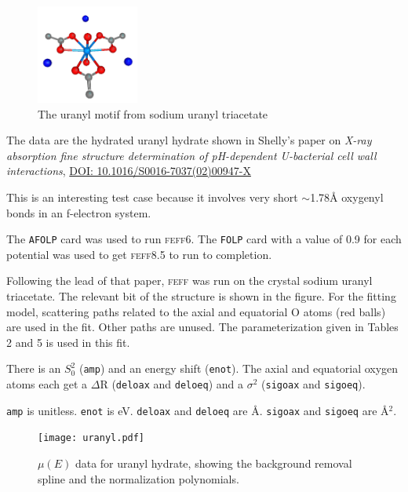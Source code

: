 \documentclass[11pt]{article}
\begin{document}
\begin{figure}
  \begin{center}
    \includegraphics[width=0.3\textwidth]{uranyl/uranyl.png}
  \end{center}
  \caption{The uranyl motif from sodium uranyl triacetate}
\end{figure}

The data are the hydrated uranyl hydrate shown in Shelly's paper on
\emph{X-ray absorption fine structure determination of pH-dependent
  U-bacterial cell wall interactions},
\href{http://dx.doi.org/10.1016/S0016-7037(02)00947-X}{DOI:
  10.1016/S0016-7037(02)00947-X}

This is an interesting test case because it involves very short
$\sim$1.78{\AA} oxygenyl bonds in an f-electron system.

The \texttt{AFOLP} card was used to run \textsc{feff6}. The
\texttt{FOLP} card with a value of 0.9 for each potential was used to
get \textsc{feff8.5} to run to completion.

Following the lead of that paper, \textsc{feff} was run on the crystal sodium
uranyl triacetate. The relevant bit of the structure is shown in the
figure. For the fitting model, scattering paths related to the axial
and equatorial O atoms (red balls) are used in the fit. Other paths
are unused. The parameterization given in Tables 2 and 5 is used in
this fit.

There is an $S_0^2$ (\texttt{amp}) and an energy shift
(\texttt{enot}). The axial and equatorial oxygen atoms each get a
$\Delta$R (\texttt{deloax} and \texttt{deloeq}) and a $\sigma^2$
(\texttt{sigoax} and \texttt{sigoeq}).

\texttt{amp} is unitless. \texttt{enot} is eV. \texttt{deloax} and
\texttt{deloeq} are {\AA}. \texttt{sigoax} and \texttt{sigoeq} are
{\AA}$^2$.

\begin{figure}[h]
  \centering
  \texttt{[image: uranyl.pdf]}
  \caption{$\mu(E)$ data for uranyl hydrate, showing the background
    removal spline and the normalization polynomials.}
  \label{fig:uranyl-data}
\end{figure}
\end{document}
